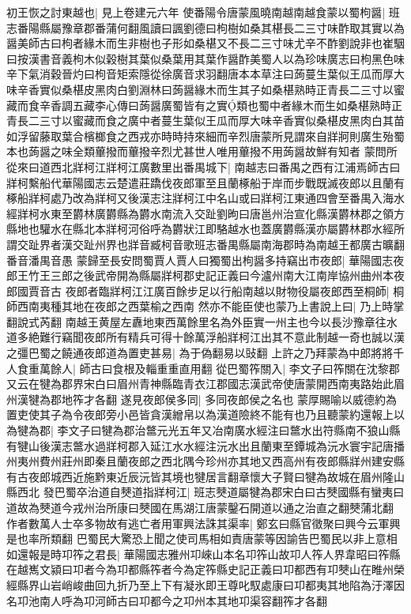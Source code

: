 初王恢之討東越也|{
	見上卷建元六年}
使番陽令唐蒙風曉南越南越食蒙以蜀枸醤|{
	班志番陽縣屬豫章郡番蒲何翻風讀曰諷劉德曰枸樹如桑其椹長二三寸味酢取其實以為醤美師古曰枸者緣木而生非樹也子形如桑椹又不長二三寸味尤辛不酢劉說非也崔駰曰按漢書音義枸木似榖樹其葉似桑葉用其葉作醤酢美蜀人以為珍味廣志曰枸黑色味辛下氣消穀晉灼曰枸音矩索隱從徐廣音求羽翻唐本本草注曰蒟蔓生葉似王瓜而厚大味辛香實似桑椹皮黑肉白劉淵林曰蒟醤緣木而生其子如桑椹熟時正青長二三寸以蜜藏而食辛香調五藏李心傳曰蒟醤廣蜀皆有之實類也蜀中者緣木而生如桑椹熟時正青長二三寸以蜜藏而食之廣中者蔓生葉似王瓜而厚大味辛香實似桑椹皮黑肉白其苗如浮留藤取葉合檳榔食之西戎亦時時持來細而辛烈唐蒙所見謂來自牂牁則廣生殆蜀本也蒟醤之味全類蓽撥而蓽撥辛烈尤甚世人唯用蓽撥不用蒟醤故鮮有知者}
蒙問所從來曰道西北牂柯江牂柯江廣數里出番禺城下|{
	南越志曰番禺之西有江浦焉師古曰牂柯繫船代華陽國志云楚遣莊蹻伐夜郎軍至且蘭椓船于岸而步戰既滅夜郎以且蘭有椓船牂柯處乃改為牂柯又後漢志注牂柯江中名山或曰牂柯江東通四會至番禺入海水經牂柯水東至欝林廣欝縣為欝水南流入交趾劉昫曰唐邕州治宣化縣漢欝林郡之領方縣地也驩水在縣北本牂柯河俗呼為欝狀江即駱越水也蓋廣欝縣漢亦屬欝林郡水經所謂交趾界者漢交趾州界也牂音臧柯音歌班志番禺縣屬南海郡時為南越王都廣古曠翻番音潘禺音愚}
蒙歸至長安問蜀賈人賈人曰獨蜀出枸醤多持竊出市夜郎|{
	華陽國志夜郎王竹王三郎之後武帝開為縣屬牂柯郡史記正義曰今瀘州南大江南岸協州曲州本夜郎國賈音古}
夜郎者臨牂柯江江廣百餘步足以行船南越以財物役屬夜郎西至桐師|{
	桐師西南夷種其地在夜郎之西葉榆之西南}
然亦不能臣使也蒙乃上書說上曰|{
	乃上時掌翻說式芮翻}
南越王黄屋左纛地東西萬餘里名為外臣實一州主也今以長沙豫章往水道多絶難行竊聞夜郎所有精兵可得十餘萬浮船牂柯江出其不意此制越一奇也誠以漢之彊巴蜀之饒通夜郎道為置吏甚易|{
	為于偽翻易以䜴翻}
上許之乃拜蒙為中郎將將千人食重萬餘人|{
	師古曰食根及輜重重直用翻}
從巴蜀筰關入|{
	李文子曰筰關在沈黎郡又云在犍為郡界宋白曰眉州青神縣臨青衣江郡國志漢武帝使唐蒙開西南夷路始此眉州漢犍為郡地筰才各翻}
遂見夜郎侯多同|{
	多同夜郎侯之名也}
蒙厚賜喻以威德約為置吏使其子為令夜郎旁小邑皆貪漢繒帛以為漢道險終不能有也乃且聽蒙約還報上以為犍為郡|{
	李文子曰犍為郡治鄨元光五年又冶南廣水經注曰鄨水出符縣南不狼山縣有犍山後漢志鄨水過牂柯郡入延江水水經注沅水出且蘭東至鐔城為沅水寰宇記唐播州夷州費州莊州即秦且蘭夜郎之西北隅今珍州亦其地又西高州有夜郎縣牂州建安縣有古夜郎城西近施黔東近辰沅皆其境也犍居言翻章懷大子賢曰犍為故城在眉州隆山縣西北}
發巴蜀卒治道自僰道指牂柯江|{
	班志僰道屬犍為郡宋白曰古僰國縣有蠻夷曰道故為僰道今戎州治所康曰僰國在馬湖江唐蒙鑿石開道以通之治直之翻僰蒲北翻}
作者數萬人士卒多物故有逃亡者用軍興法誅其渠率|{
	鄭玄曰縣官徵聚曰興今云軍興是也率所類翻}
巴蜀民大驚恐上聞之使司馬相如責唐蒙等因諭告巴蜀民以非上意相如還報是時卭筰之君長|{
	華陽國志雅州卭崍山本名卭筰山故卭人筰人界韋昭曰筰縣在越嶲文潁曰卭者今為卭都縣筰者今為定筰縣史記正義曰卭都西有卭僰山在睢州榮經縣界山岩峭峻曲回九折乃至上下有凝氷即王尊叱馭處康曰卭都夷其地陷為汙澤因名卭池南人呼為卭河師古曰卭都今之卭州本其地卭渠容翻筰才各翻}
